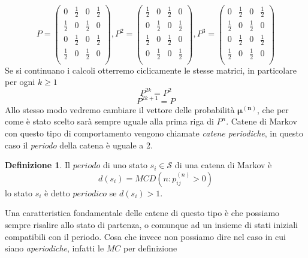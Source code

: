 \documentclass{article}
\theoremstyle{definition}
\newtheorem{definition}[theorem]{Definizione}
\theoremstyle{remark}
\begin{document}
$$ P =\begin{pmatrix}
        0           & \frac{1}{2} & 0           & \frac{1}{2} \\
        \frac{1}{2} & 0           & \frac{1}{2} & 0           \\
        0           & \frac{1}{2} & 0           & \frac{1}{2} \\
        \frac{1}{2} & 0           & \frac{1}{2} & 0           \\
    \end{pmatrix},P^2 =\begin{pmatrix}
        \frac{1}{2} & 0           & \frac{1}{2} & 0           \\
        0           & \frac{1}{2} & 0           & \frac{1}{2} \\
        \frac{1}{2} & 0           & \frac{1}{2} & 0           \\
        0           & \frac{1}{2} & 0           & \frac{1}{2} \\
    \end{pmatrix}, P^3 =\begin{pmatrix}
        0           & \frac{1}{2} & 0           & \frac{1}{2} \\
        \frac{1}{2} & 0           & \frac{1}{2} & 0           \\
        0           & \frac{1}{2} & 0           & \frac{1}{2} \\
        \frac{1}{2} & 0           & \frac{1}{2} & 0           \\
    \end{pmatrix}$$
Se si continuano i calcoli otterremo ciclicamente le stesse matrici, in particolare  per ogni $k\ge 1$
$$P^{2k} = P^2$$
$$P^{2k+1} = P$$
Allo stesso modo vedremo cambiare il vettore delle probabilità $\boldsymbol{\mu^{(n)}}$, che per come è stato scelto sarà sempre uguale alla prima riga di $P^n$.
Catene di Markov con questo tipo di comportamento vengono chiamate \textit{catene periodiche}, in questo caso il \textit{periodo} della catena è uguale a 2.
\begin{definition}
    Il $periodo$ di uno stato $s_i\in\mathcal{S}$ di una catena di Markov è $$d(s_i) = MCD(n: p_{ij}^{(n)}>0)$$
    lo stato $s_i$ è detto $periodico$ se $d(s_i)>1$.
\end{definition}
Una caratteristica fondamentale delle catene di questo tipo è che possiamo sempre risalire allo stato di partenza, o comunque ad un insieme di stati iniziali compatibili
con il periodo.
Cosa che invece non possiamo dire nel caso in cui  siano \textit{aperiodiche}, infatti le $MC$ per definizione
\end{document}
